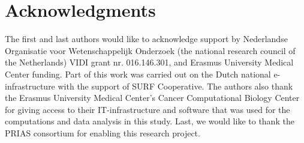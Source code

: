 \section*{Acknowledgments}
The first and last authors would like to acknowledge support by Nederlandse Organisatie voor Wetenschappelijk Onderzoek (the national research council of the Netherlands) VIDI grant nr. 016.146.301, and Erasmus University Medical Center funding. Part of this work was carried out on the Dutch national e-infrastructure with the support of SURF Cooperative. The authors also thank the Erasmus University Medical Center's Cancer Computational Biology Center for giving access to their IT-infrastructure and software that was used for the computations and data analysis in this study. Last, we would like to thank the PRIAS consortium for enabling this research project.